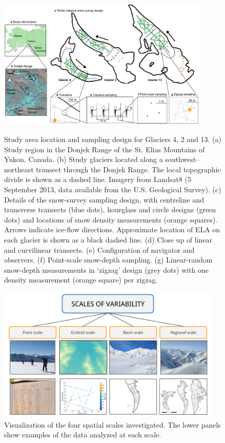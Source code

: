 \documentclass{sfuthesis}
\begin{document}
\begin{figure}
	\centering
	\includegraphics[width =0.9\textwidth]{Sampling.pdf}\\
	\caption[Study area location and sampling design for Glaciers 4, 2 and 13.]{Study area location and sampling design for Glaciers 4, 2 and 13. (a) Study region in the Donjek Range of the St. Elias Mountains of Yukon, Canada. (b) Study glaciers located along a southwest--northeast transect through the Donjek Range. The local topographic divide is shown as a dashed line. Imagery from Landsat8 (5 September 2013, data available from the U.S. Geological Survey). (c) Details of the snow-survey sampling design, with centreline and transverse transects (blue dots), hourglass and circle designs (green dots) and locations of snow density measurements (orange squares). Arrows indicate ice-flow directions. Approximate location of ELA on each glacier is shown as a black dashed line. (d) Close up of linear and curvilinear transects. (e) Configuration of navigator and observers. (f) Point-scale snow-depth sampling. (g) Linear-random snow-depth measurements in `zigzag' design (grey dots) with one density measurement (orange square) per zigzag.}
	\label{fig:Sampling}
\end{figure}


 \begin{figure}
           \includegraphics[width = 0.95\textwidth]{ScalesOfVariability.png}
       \caption[Visualization of the four spatial scales investigated]{Visualization of the four spatial scales investigated. The lower panels show examples of the data analyzed at each scale.}
       \label{fig:flowchart_scales}
\end{figure}
\end{document}
